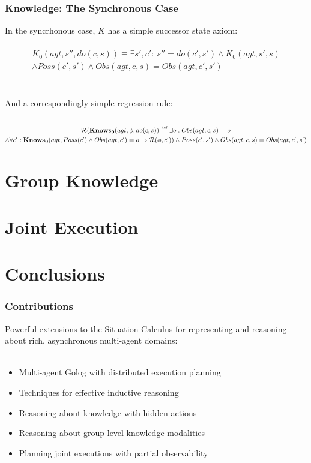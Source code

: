 \documentclass{beamer}
\newcommand{\isdef}{\hbox{$\stackrel{\mbox{\tiny def}}{=}$}}
\newcommand{\Reg}{\mathcal{R}}
\newcommand{\KnowsZ}{\mathbf{Knows_{0}}}
\begin{document}
\begin{frame}
\frametitle{Knowledge: The Synchronous Case}
In the syncrhonous case, $K$ has a simple successor state axiom:
\ \\
\ \\
\begin{multline*}
 K_0(agt,s'',do(c,s)) \equiv \exists s',c':\ s''=do(c',s') \wedge K_0(agt,s',s)\\
  \wedge Poss(c',s') \wedge Obs(agt,c,s) = Obs(agt,c',s')
\end{multline*}
\ \\
\ \\
And a correspondingly simple regression rule:
\ \\
\ \\
\begin{multline*}
 \Reg(\KnowsZ(agt,\phi,do(c,s))\ \isdef\ \exists o: Obs(agt,c,s)=o\\
  \wedge \forall c': \KnowsZ(agt,Poss(c')\wedge Obs(agt,c')=o \rightarrow \Reg(\phi,c'))
  \wedge Poss(c',s') \wedge Obs(agt,c,s) = Obs(agt,c',s')
\end{multline*}

\end{frame}


\section{Group Knowledge}

\begin{frame}
\end{frame}

\section{Joint Execution}

\begin{frame}
\end{frame}

\section{Conclusions}

\begin{frame}
  \frametitle{Contributions}
  Powerful extensions to the Situation Calculus for representing and reasoning
  about rich, asynchronous multi-agent domains:
  \ \\
  \ \\
  \begin{itemize}
  \item Multi-agent Golog with distributed execution planning
  \item Techniques for effective inductive reasoning
  \item Reasoning about knowledge with hidden actions
  \item Reasoning about group-level knowledge modalities
  \item Planning joint executions with partial observability
  \end{itemize}
\end{frame}
\end{document}

